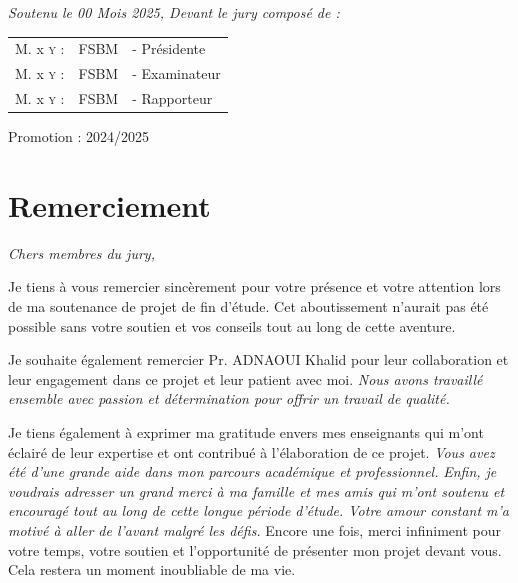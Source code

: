 \documentclass[a4paper,12pt]{report}
\newcommand{\mychapter}[2]{%
  \chapter*{#2}%
  \addcontentsline{toc}{chapter}{#2}%
}
\begin{document}
\begin{titlepage}
{\large \textit{Soutenu le 00 Mois 2025, Devant le jury composé de : }}\\[0.5cm]

\centering
\begin{tabular}{lll}
\large M. x \textsc{y} : & \large FSBM & \large - Présidente \\[0.1cm]
\large M. x \textsc{y} : & \large FSBM & \large - Examinateur \\[0.1cm]
\large M. x \textsc{y} : & \large FSBM & \large - Rapporteur
\end{tabular}

\vspace{20mm}
{\large Promotion : 2024/2025}
\end{titlepage}

\newpage
\tableofcontents

\newpage
\mychapter{Remerciement}{Remerciement}

\begin{center}
  \textit{Chers membres du jury,}
\end{center}

\vspace{0.5cm}

\onehalfspacing
Je tiens à vous remercier sincèrement pour votre présence et votre attention lors de ma soutenance de projet de fin d’étude. Cet aboutissement n’aurait pas été possible sans votre soutien et vos conseils tout au long de cette aventure.

\vspace{0.3cm}
Je souhaite également remercier Pr. ADNAOUI Khalid pour leur collaboration et leur engagement dans ce projet et leur patient avec moi. \textit{Nous avons travaillé ensemble avec passion et détermination pour offrir un travail de qualité.}
\vspace{0.3cm}

Je tiens également à exprimer ma gratitude envers mes enseignants qui m’ont éclairé de leur expertise et ont contribué à l’élaboration de ce projet. \textit{Vous avez été d’une grande aide dans mon parcours académique et professionnel.}
\vspace{0.3cm}
\textit{Enfin, je voudrais adresser un grand merci à ma famille et mes amis qui m’ont soutenu et encouragé tout au long de cette longue période d’étude. Votre amour constant m’a motivé à aller de l’avant malgré les défis.}
\vspace{0.3cm}
Encore une fois, merci infiniment pour votre temps, votre soutien et l’opportunité de présenter mon projet devant vous. Cela restera un moment inoubliable de ma vie.
\vspace{0.5cm}
\end{document}
